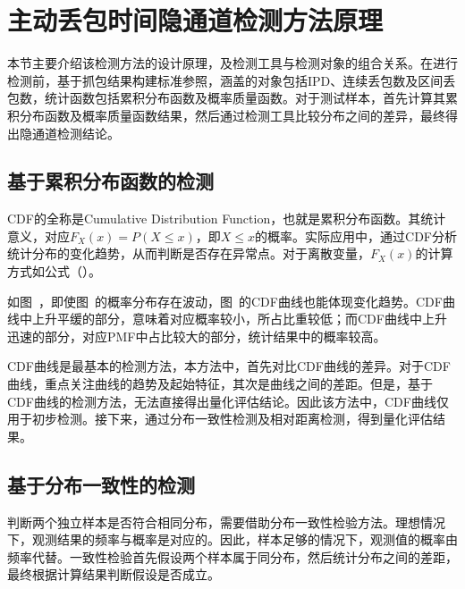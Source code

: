\section{主动丢包时间隐通道检测方法原理}
\label{chap:analyze:statistical}

本节主要介绍该检测方法的设计原理，及检测工具与检测对象的组合关系。在进行检测前，基于抓包结果构建标准参照，涵盖的对象包括IPD、连续丢包数及区间丢包数，统计函数包括累积分布函数及概率质量函数。对于测试样本，首先计算其累积分布函数及概率质量函数结果，然后通过检测工具比较分布之间的差异，最终得出隐通道检测结论。

\subsection{基于累积分布函数的检测}
\label{chap:analyze:statistical:cdf}

CDF的全称是Cumulative Distribution Function，也就是累积分布函数。其统计意义，对应$F_{X}(x)=P (X\leq x)$，即$X\leq x$的概率。实际应用中，通过CDF分析统计分布的变化趋势，从而判断是否存在异常点。对于离散变量，$F_{X}(x)$的计算方式如公式（）。

如图\ ，即使图\ 的概率分布存在波动，图\ 的CDF曲线也能体现变化趋势。CDF曲线中上升平缓的部分，意味着对应概率较小，所占比重较低；而CDF曲线中上升迅速的部分，对应PMF中占比较大的部分，统计结果中的概率较高。

CDF曲线是最基本的检测方法，本方法中，首先对比CDF曲线的差异。对于CDF曲线，重点关注曲线的趋势及起始特征，其次是曲线之间的差距。但是，基于CDF曲线的检测方法，无法直接得出量化评估结论。因此该方法中，CDF曲线仅用于初步检测。接下来，通过分布一致性检测及相对距离检测，得到量化评估结果。

\subsection{基于分布一致性的检测}
\label{chap:analyze:statistical:test}

判断两个独立样本是否符合相同分布，需要借助分布一致性检验方法。理想情况下，观测结果的频率与概率是对应的。因此，样本足够的情况下，观测值的概率由频率代替。一致性检验首先假设两个样本属于同分布，然后统计分布之间的差距，最终根据计算结果判断假设是否成立。

